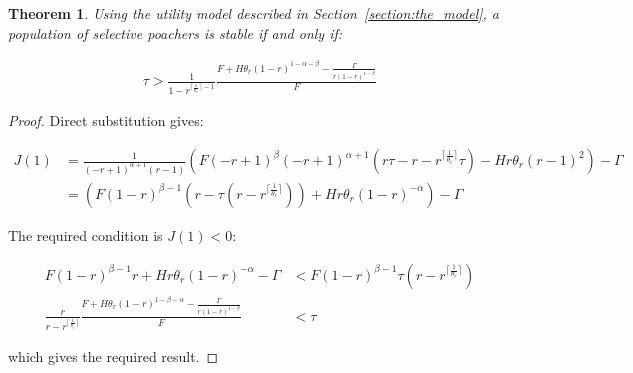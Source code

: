 \documentclass[10pt]{article}
\newtheorem{theorem}{Theorem}
\begin{document}
\begin{theorem}\label{theorem:selective}
Using the utility model described in Section~\ref{section:the_model},
a population of selective poachers is stable if and only if:

\begin{equation}
    \begin{split}\label{eq:selective_stability}
    \tau > \frac{1}{1 - r^{\lceil{\frac{1}{\theta_{r}}}\rceil - 1}}
    \frac{F + H \theta_{r} (1 - r) ^{1- \alpha -\beta}-\frac{\Gamma}{r(1-r)^{1-\beta}}}{F}
\end{split}
\end{equation}
\end{theorem}

\begin{proof}
Direct substitution gives:

\begin{equation*}
    \begin{split}
    J(1) &= \frac{1}{\left(- r + 1\right)^{\alpha + 1} \left(r - 1\right)}
                \left(
                    F \left(- r + 1\right)^{\beta}
                    \left(- r + 1\right)^{\alpha + 1}
                    \left(
                        r \tau -
                        r -
                        r^{\lceil{\frac{1}{\theta_{r}}}\rceil} \tau
                    \right)
                    - H r
                    \theta_{r}
                    \left(r - 1\right)^{2}
                \right) - \Gamma\\
		&= \left(F
                 \left(1 - r\right)^{\beta - 1}
                 \left(
                     r -
                     \tau(r - r^{\lceil{\frac{1}{\theta_{r}}}\rceil} )
                 \right) +
                 H r \theta_{r} \left(1 - r\right)^{-\alpha}
           \right)
           - \Gamma
        \end{split}
    \end{equation*}

The required condition is \(J(1)<0\):

\begin{equation*}
    \begin{split}
    F
    \left(1 - r\right)^{\beta - 1}r +
    H r \theta_{r}
    \left(1 - r\right)^{-\alpha}
    - \Gamma
            & < F \left(1 - r\right)^{\beta - 1}
    \tau(r - r^{\lceil{\frac{1}{\theta_{r}}}\rceil} )\\
    \frac{r}{r - r^{\lceil{\frac{1}{\theta_{r}}}\rceil}}
    \frac{F + H \theta_{r} \left(1 - r\right)^{1-\beta-\alpha} -
    \frac{\Gamma}{r(1-r)^{1-\beta}}}{F} & < \tau
\end{split}
\end{equation*}

which gives the required result.
\end{proof}
\end{document}
